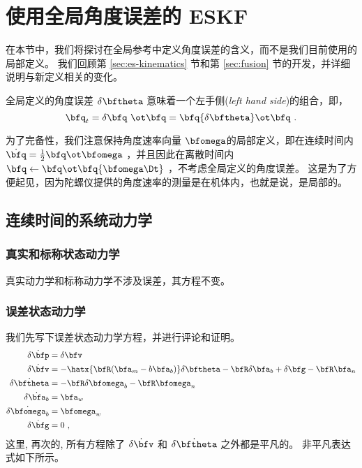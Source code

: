 

\section{使用全局角度误差的 ESKF}
\label{sec:ESKFglobal}

在本节中，我们将探讨在全局参考中定义角度误差的含义，而不是我们目前使用的局部定义。 
我们回顾第 \ref{sec:es-kinematics} 节和第 \ref{sec:fusion} 节的开发，并详细说明与新定义相关的变化。

全局定义的角度误差 $\delta\bftheta$ 意味着一个左手侧(\emph{left hand side})的组合，即，
%
\begin{equation*}
\bfq_t = \delta\bfq\ \ot \bfq = \bfq\{\delta\bftheta\} \ot \bfq~.
\end{equation*}

为了完备性，我们注意保持角度速率向量 $\bfomega$的局部定义，即在连续时间内 $\dot\bfq=\frac12\bfq\ot\bfomega$ ，并且因此在离散时间内 $\bfq \gets \bfq\ot\bfq\{\bfomega\Dt\}$ ，不考虑全局定义的角度误差。 
这是为了方便起见，因为陀螺仪提供的角度速率的测量是在机体内，也就是说，是局部的。

\subsection{连续时间的系统动力学}

\subsubsection{真实和标称状态动力学}

真实动力学和标称动力学不涉及误差，其方程不变。

\subsubsection{误差状态动力学}

我们先写下误差状态动力学方程，并进行评论和证明。
%
\begin{subequations}\label{equ:efullglobal}
%
\begin{align}
\dot{\delta\bfp} &= \delta\bfv \label{equ:epglobal} \\
\dot{\delta\bfv} &= -\hatx{\bfR(\bfa_m-b\bfa_b)}\delta\bftheta - \bfR\delta\bfa_b + \delta\bfg - \bfR\bfa_n \label{equ:evglobal}\\
\dot{\delta\bftheta} &= -\bfR\delta\bfomega_b - \bfR\bfomega_n \label{equ:etglobal}\\
\dot{\delta\bfa_b} &= \bfa_w \label{equ:eabglobal}\\
\dot{\delta\bfomega_b} &= \bfomega_w \label{equ:ewbglobal}\\
\dot{\delta\bfg} &= 0 ~, \label{equ:egglobal}
\end{align}%
\end{subequations}%
%
这里, 再次的, 所有方程除了 $\dot{\delta\bfv}$ 和 $\dot{\delta\bftheta}$ 之外都是平凡的。 
非平凡表达式如下所示。


